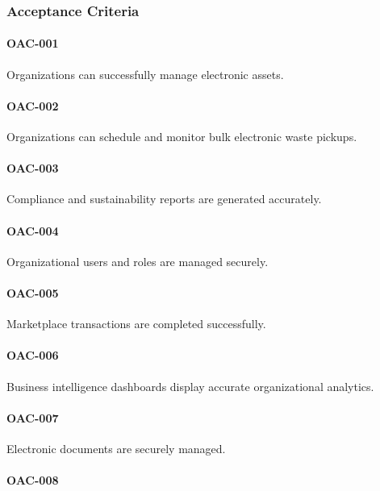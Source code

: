 \subsubsection*{Acceptance Criteria}

\paragraph{OAC-001}

Organizations can successfully manage electronic assets.

\paragraph{OAC-002}

Organizations can schedule and monitor bulk electronic waste pickups.

\paragraph{OAC-003}

Compliance and sustainability reports are generated accurately.

\paragraph{OAC-004}

Organizational users and roles are managed securely.

\paragraph{OAC-005}

Marketplace transactions are completed successfully.

\paragraph{OAC-006}

Business intelligence dashboards display accurate organizational
analytics.

\paragraph{OAC-007}

Electronic documents are securely managed.

\paragraph{OAC-008}

